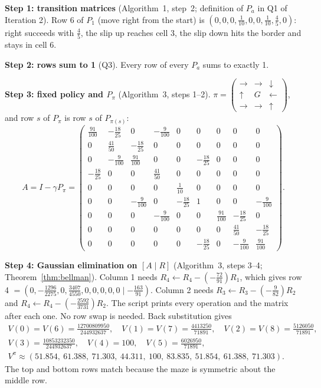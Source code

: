 \noindent\textbf{Step 1: transition matrices} (Algorithm~1, step~2; definition of $P_a$ in Q1 of Iteration 2). Row 6 of $P_1$ (move right from the start) is $(0,0,0,\tfrac1{10},0,0,\tfrac1{10},\tfrac45,0)$: right succeeds with $\tfrac45$, the slip up reaches cell 3, the slip down hits the border and stays in cell 6.

\noindent\textbf{Step 2: rows sum to 1} (Q3). Every row of every $P_a$ sums to exactly 1.

\noindent\textbf{Step 3: fixed policy and $P_\pi$} (Algorithm~3, steps 1--2).
$\pi = \left(\begin{smallmatrix}\rightarrow&\rightarrow&\downarrow\\ \uparrow&G&\leftarrow\\ \rightarrow&\rightarrow&\uparrow\end{smallmatrix}\right)$, and row $s$ of $P_\pi$ is row $s$ of $P_{\pi(s)}$:
{\small
\[
A = I-\gamma P_\pi =
\begin{pmatrix}
\frac{91}{100}&-\frac{18}{25}&0&-\frac9{100}&0&0&0&0&0\\
0&\frac{41}{50}&-\frac{18}{25}&0&0&0&0&0&0\\
0&-\frac9{100}&\frac{91}{100}&0&0&-\frac{18}{25}&0&0&0\\
-\frac{18}{25}&0&0&\frac{41}{50}&0&0&0&0&0\\
0&0&0&0&\frac1{10}&0&0&0&0\\
0&0&-\frac9{100}&0&-\frac{18}{25}&1&0&0&-\frac9{100}\\
0&0&0&-\frac9{100}&0&0&\frac{91}{100}&-\frac{18}{25}&0\\
0&0&0&0&0&0&0&\frac{41}{50}&-\frac{18}{25}\\
0&0&0&0&0&-\frac{18}{25}&0&-\frac9{100}&\frac{91}{100}
\end{pmatrix}.
\]}

\noindent\textbf{Step 4: Gaussian elimination on $[A\mid R]$} (Algorithm~3, steps 3--4; Theorem~\ref{thm:bellman}). Column 1 needs $R_4\leftarrow R_4-(-\tfrac{72}{91})R_1$, which gives row 4 $=(0,-\tfrac{1296}{2275},0,\tfrac{3407}{4550},0,0,0,0,0\mid-\tfrac{163}{91})$. Column 2 needs $R_3\leftarrow R_3-(-\tfrac9{82})R_2$ and $R_4\leftarrow R_4-(-\tfrac{2592}{3731})R_2$. The script prints every operation and the matrix after each one. No row swap is needed. Back substitution gives
\begin{gather*}
V(0) = V(6) = \tfrac{12700809950}{244932637},\quad V(1) = V(7) = \tfrac{4413250}{71891},\quad V(2) = V(8) = \tfrac{5126050}{71891},\\
V(3) = \tfrac{10853232350}{244932637},\quad V(4) = 100,\quad V(5) = \tfrac{6026950}{71891},\\
V^\pi \approx(51.854,\ 61.388,\ 71.303,\ 44.311,\ 100,\ 83.835,\ 51.854,\ 61.388,\ 71.303).
\end{gather*}
The top and bottom rows match because the maze is symmetric about the middle row.

